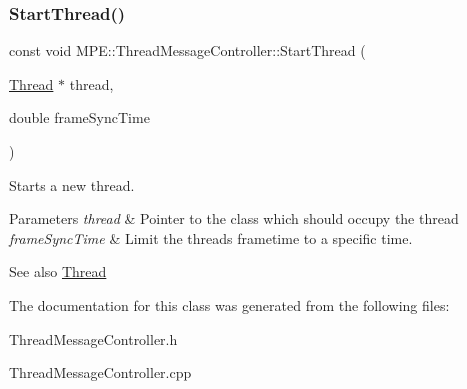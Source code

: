 \subsubsection{\texorpdfstring{Start\+Thread()}{StartThread()}}
{\footnotesize\ttfamily const void M\+P\+E\+::\+Thread\+Message\+Controller\+::\+Start\+Thread (\begin{DoxyParamCaption}\item[{\hyperlink{class_m_p_e_1_1_thread}{Thread} $\ast$}]{thread,  }\item[{double}]{frame\+Sync\+Time }\end{DoxyParamCaption})}



Starts a new thread. 


\begin{DoxyParams}{Parameters}
{\em thread} & Pointer to the class which should occupy the thread \\
\hline
{\em frame\+Sync\+Time} & Limit the thread\textquotesingle{}s frametime to a specific time. \\
\hline
\end{DoxyParams}
\begin{DoxySeeAlso}{See also}
\hyperlink{class_m_p_e_1_1_thread}{Thread} 
\end{DoxySeeAlso}


The documentation for this class was generated from the following files\+:\begin{DoxyCompactItemize}
\item 
Thread\+Message\+Controller.\+h\item 
Thread\+Message\+Controller.\+cpp\end{DoxyCompactItemize}
